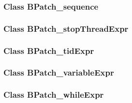 \subsubsection{Class BPatch\_sequence}


\subsubsection{Class BPatch\_stopThreadExpr}


\subsubsection{Class BPatch\_tidExpr}


\subsubsection{Class BPatch\_variableExpr}


\subsubsection{Class BPatch\_whileExpr}

